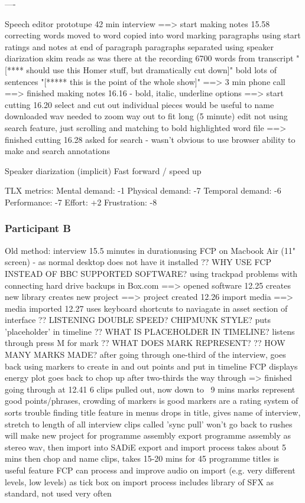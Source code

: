 ----

Speech editor prototupe
42 min interview
==> start making notes 15.58
correcting words
moved to word
copied into word
marking paragraphs using start ratings and notes at end of paragraph
paragraphs separated using speaker diarization
skim reads as was there at the recording
6700 words from transcript
"[**** should use this Homer stuff, but dramatically cut down]"
bold lots of sentences
"[***** this is the point of the whole show]"
==> 3 min phone call
==> finished making notes 16.16
- bold, italic, underline options
==> start cutting 16.20
select and cut out individual pieces
would be useful to name downloaded wav
needed to zoom way out to fit long (5 minute) edit
not using search feature, just scrolling and matching to bold highlighted word
file
==> finished cutting 16.28
asked for search - wasn't obvious to use browser
ability to make and search annotations

Speaker diarization (implicit)
Fast forward / speed up

TLX metrics:
Mental demand: -1
Physical demand: -7
Temporal demand: -6
Performance: -7
Effort: +2
Frustration: -8

\subsubsection{Participant B}

Old method:
interview 15.5 minutes in durationusing FCP on Macbook Air (11" screen) - as normal desktop does not have it installed
?? WHY USE FCP INSTEAD OF BBC SUPPORTED SOFTWARE?
using trackpad
problems with connecting hard drive
backups in Box.com
==> opened software 12.25
creates new library
creates new project
==> project created 12.26
import media
==> media imported 12.27
uses keyboard shortcuts to naviagate in asset section of interface
?? LISTENING DOUBLE SPEED? CHIPMUNK STYLE?
puts 'placeholder' in timeline
?? WHAT IS PLACEHOLDER IN TIMELINE?
listens through press M for mark
?? WHAT DOES MARK REPRESENT?
?? HOW MANY MARKS MADE?
after going through one-third of the interview, goes back using markers to create in and out points and put in timeline
FCP displays energy plot
goes back to chop up after two-thirds the way through
=> finished going through at 12.41
6 clips pulled out, now down to ~9 mins
marks represent good points/phrases, crowding of markers is good
markers are a rating system of sorts
trouble finding title feature in menus
drops in title, gives name of interview, stretch to length of all interview clips
called 'sync pull'
won't go back to rushes
will make new project for programme assembly
export programme assembly as stereo wav, then import into SADiE
export and import process takes about  5 mins
then chop and name clips, takes 15-20 mins for 45 programme
titles is useful feature
FCP can process and improve audio on import (e.g. very different levels, low levels) as tick box on import process
includes library of SFX as standard, not used very often

